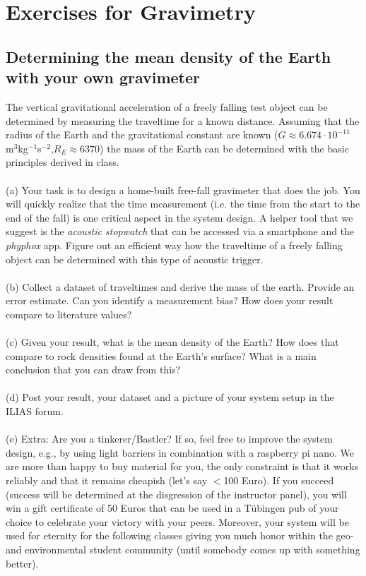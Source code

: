 \documentclass[a4paper,12pt]{article}
\begin{document}
\section{Exercises for Gravimetry}
\subsection{Determining the mean density of the Earth with your own gravimeter}
\noindent The vertical gravitational acceleration of a freely falling test object can be determined by measuring the traveltime for a known distance. Assuming that the radius of the Earth and the gravitational constant are known ($G\approx6.674\cdot10^{-11}$ m$^{3}$kg$^{-1}$s$^{-2}$,$R_E \approx 6370 $) the mass of the Earth can be determined with the basic principles derived in class.\\ 
\\
\noindent (a) Your task is to design a home-built free-fall gravimeter that does the job. You will quickly realize that the time measurement (i.e. the time from the start to the end of the fall) is one critical aspect in the system design. A helper tool that we suggest is the \textit{acoustic stopwatch} that can be accessed via a smartphone and the \textit{phyphox} app. Figure out an efficient way how the traveltime of a freely falling object can be determined with this type of acoustic trigger.\\
\\

\noindent (b) Collect a dataset of traveltimes and derive the mass of the earth. Provide an error estimate. Can you identify a measurement bias? How does your result compare to literature values? \\
\\
\noindent (c) Given your result, what is the mean density of the Earth? How does that compare to rock densities found at the Earth's surface? What is a main conclusion that you can draw from this?\\
 \\
\noindent (d) Post your result, your dataset and a picture of your system setup in the ILIAS forum. \\
 \\
\noindent (e) Extra: Are you a tinkerer/Bastler? If so, feel free to improve the system design, e.g., by using light barriers in combination with a raspberry pi nano. We are more than happy to buy material for you, the only constraint is that it works reliably and that it remains cheapish (let's say $<$100 Euro). If you succeed (success will be determined at the disgression of the instructor panel), you will win a gift certificate of 50 Euros that can be used in a Tübingen pub of your choice to celebrate your victory with your peers. Moreover, your system will be used for eternity for the following classes giving you much honor within the geo- and environmental student community (until somebody comes up with something better).
\end{document}
